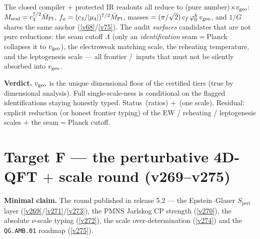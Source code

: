 \begin{keybox}
The closed compiler $+$ protected IR readouts all reduce to (pure number)$\times v_{\mathrm{geo}}$:
$M_{\mathrm{scal}}=c_3^{7/2}\bar M_{\mathrm{Pl}}$, $f_a=(c_3/|\mu_4|)^{7/2}\bar M_{\mathrm{Pl}}$, masses
$=(\pi/\sqrt2)\,c_f\,\varphi_0^{k}\,v_{\mathrm{geo}}$, and $1/G$ shares the same anchor (\vref{v68}/\vref{v75}). The audit
\emph{surfaces} candidates that are not pure reductions: the seam cutoff $\Lambda$ (only an
\emph{identification} seam$=$Planck collapses it to $v_{\mathrm{geo}}$), the electroweak matching scale, the
reheating temperature, and the leptogenesis scale --- all frontier \mC/\mO\ inputs that must not be
silently absorbed into $v_{\mathrm{geo}}$.
\end{keybox}

\noindent\textbf{Verdict.} $v_{\mathrm{geo}}$ is the unique dimensional floor of the certified tiers (true by
dimensional analysis). Full single-scale-ness is conditional on the flagged identifications staying
honestly typed. Status \mE\,(ratios) $+$ \mO\,(one scale). Residual: explicit reduction (or honest
frontier typing) of the EW / reheating / leptogenesis scales $+$ the seam$=$Planck cutoff.

\section*{Target F --- the perturbative 4D-QFT $+$ scale round (v269--v275)}\label{sec:F}
\noindent\textbf{Minimal claim.} The round published in release 5.2 --- the Epstein--Glaser
$S_{\mathrm{pert}}$ layer (\vref{v269}/\vref{v271}/\vref{v273}), the PMNS Jarlskog CP strength
(\vref{v270}), the absolute $\nu$-scale typing (\vref{v272}), the scale over-determination
(\vref{v274}) and the \texttt{QG.AMB.01} roadmap (\vref{v275}).

